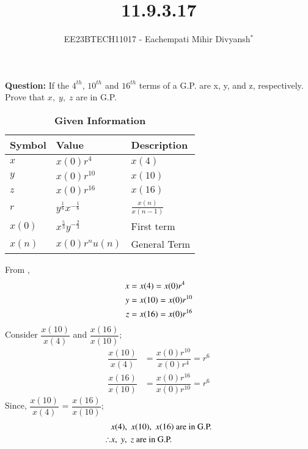 \documentclass[journal,12pt,twocolumn]{IEEEtran}
\theoremstyle{remark}
\begin{document}

\vspace{3cm}

\title{11.9.3.17}
\author{EE23BTECH11017 - Eachempati Mihir Divyansh$^{*}$%
}
\maketitle
\newpage
\bigskip

\renewcommand{\thefigure}{\theenumi}
\renewcommand{\thetable}{\theenumi}

\textbf{Question: }
If the $4^{th}$, $10^{th}$ and $16^{th}$ terms of a G.P. are x, y, and z, respectively. Prove that $x,\; y,\; z$ are in G.P.

\begin{table}[h]
    \renewcommand\thetable{1}
    \centering
        \caption{\textbf{Given Information}}
    \begin{tabular}{|m{2cm}|m{2cm}|m{2cm}|}
    \hline
    \textbf{Symbol} & \textbf{Value} & \textbf{Description}\\ [1ex]
    \hline
        $x$ & $x(0)r^4$ & $x(4)$ \\ [1ex]
    \hline
        $y$ & $x(0)r^{10}$ & $x(10)$\\ [1ex]
    \hline
        $z$ & $x(0)r^{16}$ & $x(16)$\\ [1ex]
    \hline
        $r$ & $y^{\frac{1}{6}}x^{-\frac{1}{6}}$ & $\frac{x(n)}{x(n-1)}$\\[1ex]
    \hline \vspace{0.1cm}
        $x(0)$ & $x^{\frac{5}{3}}y^{-\frac{2}{3}}$ & First term \\[1ex]
    \hline
        $x(n)$ & $x(0)r^nu(n)$ & General Term \\ [1ex]
    \hline
    \end{tabular}\label{Table 1}
\end{table} 

\solution

From ,
\begin{align}
\notag x&= x(4) =x(0)r^4 \\
\notag y&=x(10)=x(0)r^{10} \\
\notag z&=x(16)=x(0)r^{16}
\end{align}
Consider $\dfrac{x(10)}{x(4)}$ and $\dfrac{x(16)}{x(10)}$;
\begin{align}
 \dfrac{x(10)}{x(4)} &= \dfrac{x(0)r^{10}}{x(0)r^4} = r^6\\ 
 \dfrac{x(16)}{x(10)} &= \dfrac{x(0)r^{16}}{x(0)r^{10}} = r^6
\end{align}
Since, $\dfrac{x(10)}{x(4)}$ = $\dfrac{x(16)}{x(10)}$;\\
\begin{align}  
\notag   & x(4),\; x(10),\; x(16)\text{ are in G.P.} \\
\notag  \therefore & x,\; y,\; z \text{ are in G.P.}
\end{align}
\end{document}
